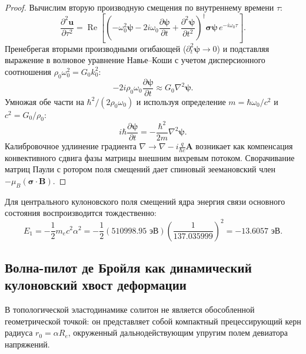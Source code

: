 \documentclass[11pt,a4paper]{article}
\theoremstyle{definition}
\theoremstyle{remark}
\begin{document}
\begin{proof}
Вычислим вторую производную смещения по внутреннему времени $\tau$:
\begin{equation}
    \frac{\partial^2 \mathbf{u}}{\partial \tau^2} = \operatorname{Re}\left[ \left( -\omega_0^2 \boldsymbol{\psi} - 2i \omega_0 \frac{\partial \boldsymbol{\psi}}{\partial t} + \frac{\partial^2 \boldsymbol{\psi}}{\partial t^2} \right)^\dagger \boldsymbol{\sigma} \boldsymbol{\psi} \, e^{-i\omega_0 \tau} \right].
\end{equation}
Пренебрегая вторыми производными огибающей ($\partial_t^2 \boldsymbol{\psi} \to 0$) и подставляя выражение в волновое уравнение Навье--Коши с учетом дисперсионного соотношения $\rho_0 \omega_0^2 = G_0 k_0^2$:
\begin{equation}
    -2i \rho_0 \omega_0 \frac{\partial \boldsymbol{\psi}}{\partial t} \approx G_0 \nabla^2 \boldsymbol{\psi}.
\end{equation}
Умножая обе части на $\hbar^2 / (2 \rho_0 \omega_0)$ и используя определение $m = \hbar \omega_0 / c^2$ и $c^2 = G_0 / \rho_0$:
\begin{equation}
    i \hbar \frac{\partial \boldsymbol{\psi}}{\partial t} = -\frac{\hbar^2}{2m} \nabla^2 \boldsymbol{\psi}.
\end{equation}
Калибровочное удлинение градиента $\nabla \to \nabla - i\frac{q}{\hbar c}\mathbf{A}$ возникает как компенсация конвективного сдвига фазы матрицы внешним вихревым потоком. Сворачивание матриц Паули с ротором поля смещений дает спиновый зеемановский член $-\mu_B (\boldsymbol{\sigma}\cdot\mathbf{B})$.
\end{proof}

Для центрального кулоновского поля смещений ядра энергия связи основного состояния воспроизводится тождественно:
\begin{equation}
    E_1 = -\frac{1}{2} m_e c^2 \alpha^2 = -\frac{1}{2} (510998.95\text{ эВ}) \left( \frac{1}{137.035999} \right)^2 = \mathbf{-13.6057\text{ эВ}}.
\end{equation}

\subsection{Волна-пилот де Бройля как динамический кулоновский хвост деформации}
В топологической эластодинамике солитон не является обособленной геометрической точкой: он представляет собой компактный прецессирующий керн радиуса $r_0 = \alpha R_e$, окруженный дальнодействующим упругим полем девиатора напряжений.
\end{document}
